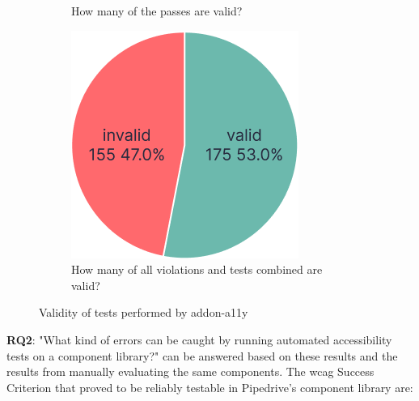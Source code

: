 \documentclass{master_thesis}
\begin{document}
\begin{figure}[ht]
\begin{subfigure}{0.3\textwidth}
	\caption{How many of the passes are valid?}
	\label{fig:checks-validity-passed}
	\end{subfigure}
	\hspace{0.03\textwidth}
	\begin{subfigure}{0.3\textwidth}
	\includegraphics[width=\textwidth]{img/violations+passes.png}
	\caption{How many of all violations and tests combined are valid?}
	\label{fig:checks-validity-all}
	\end{subfigure}
\caption{Validity of tests performed by addon-a11y}
\label{fig:checks-validity}
\end{figure}

\textbf{RQ2}: "What kind of errors can be caught by running automated accessibility tests on a component library?" can be answered based on these results and the results from manually evaluating the same components. The \ac{wcag} Success Criterion that proved to be reliably testable in Pipedrive's component library are:
\end{document}
